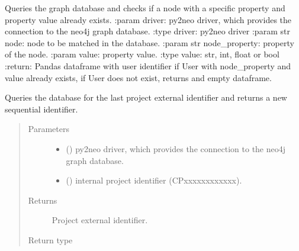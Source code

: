 \documentclass[letterpaper,10pt,english]{sphinxmanual}
\begin{document}
\begin{fulllineitems}
\label{\detokenize{_autosummary/report_manager.apps:report_manager.apps.projectCreation.check_if_node_exists}}
Queries the graph database and checks if a node with a specific property and property value already exists.
:param driver: py2neo driver, which provides the connection to the neo4j graph database.
:type driver: py2neo driver
:param str node: node to be matched in the database.
:param str node\_property: property of the node.
:param value: property value.
:type value: str, int, float or bool
:return: Pandas dataframe with user identifier if User with node\_property and value already exists,             if User does not exist, returns and empty dataframe.

\end{fulllineitems}


\begin{fulllineitems}
\label{\detokenize{_autosummary/report_manager.apps:report_manager.apps.projectCreation.get_new_project_identifier}}
Queries the database for the last project external identifier and returns a new sequential identifier.
\begin{quote}\begin{description}
\item[{Parameters}] \leavevmode\begin{itemize}
\item {} 
 () \textendash{} py2neo driver, which provides the connection to the neo4j graph database.

\item {} 
 () \textendash{} internal project identifier (CPxxxxxxxxxxxx).

\end{itemize}

\item[{Returns}] \leavevmode
Project external identifier.

\item[{Return type}] \leavevmode
{}

\end{description}\end{quote}

\end{fulllineitems}
\end{document}
